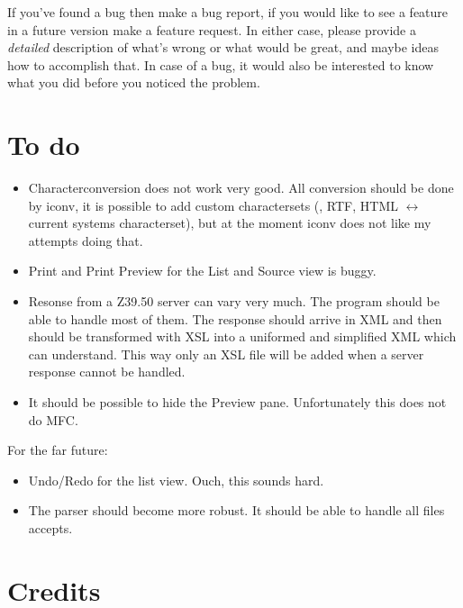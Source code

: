 \documentclass[oneside,10pt]{article}
\begin{document}
If you've found a bug then make a bug report, if you would like to see a feature
in a future version make a feature request. In either case, please provide a \emph{detailed}
description of what's wrong or what would be great, and maybe ideas how to accomplish
that. In case of a bug, it would also be interested to know what you did before
you noticed the problem.

\section{To do}
\label{sec:ToDo}

\begin{itemize}
  \item Characterconversion does not work very good. All conversion should be done
    by iconv, it is possible to add custom charactersets (\BibTeX{}, RTF, HTML
    $\leftrightarrow$ current systems characterset), but at the moment iconv does
    not like my attempts doing that.
  \item Print and Print Preview for the List and Source view is buggy.
  \item Resonse from a Z39.50 server can vary very much. The program should be able
    to handle most of them. The response should arrive in XML and then should be
    transformed with XSL into a uniformed and simplified XML which \BibEdt{} can understand. This
    way only an XSL file will be added when a server response cannot be handled.
  \item It should be possible to hide the Preview pane. Unfortunately this does
    not do MFC.
\end{itemize}
For the far future:
\begin{itemize}
  \item Undo/Redo for the list view. Ouch, this sounds hard.
  \item The \BibTeX{} parser should become more robust. It should be able to handle
    all files \BibTeX{} accepts.
\end{itemize}

\section{Credits}
\label{sec:Credits}
\end{document}

